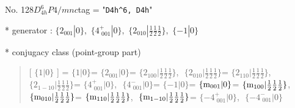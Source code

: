 \documentclass[fleqn,10pt,landscape]{jsarticle}
\begin{document}
\newpage

No. 128\quad$D_{4h}^{6}$\quad$P4/mnc$\quad[ tetragonal ]
tag = "{\tt D4h^6, D4h}"

* generator : $\{2{}_{001}|0\},\,\,\{4^{+}_{\,\,001}|0\},\,\,\{2{}_{010}|\frac{1}{2} \frac{1}{2} \frac{1}{2}\},\,\,\{-1|0\}$

* conjugacy class (point-group part)
\begin{quote}
[ $\{1|0\}$ ] = \quad $\{1|0\}$\newline[ $\{2{}_{001}|0\}$ ] = \quad $\{2{}_{001}|0\}$ = \quad $\{2{}_{100}|\frac{1}{2} \frac{1}{2} \frac{1}{2}\}$,\,\, $\{2{}_{010}|\frac{1}{2} \frac{1}{2} \frac{1}{2}\}$ = \quad $\{2{}_{110}|\frac{1}{2} \frac{1}{2} \frac{1}{2}\}$,\,\, $\{2{}_{1-10}|\frac{1}{2} \frac{1}{2} \frac{1}{2}\}$\newline[ $\{4^{+}_{\,\,001}|0\}$ ] = \quad $\{4^{+}_{\,\,001}|0\}$,\,\, $\{4^{-}_{\,\,001}|0\}$\newline[ $\{-1|0\}$ ] = \quad $\{-1|0\}$\newline[ $\{{\rm m}_{001}|0\}$ ] = \quad $\{{\rm m}_{001}|0\}$ = \quad $\{{\rm m}_{100}|\frac{1}{2} \frac{1}{2} \frac{1}{2}\}$,\,\, $\{{\rm m}_{010}|\frac{1}{2} \frac{1}{2} \frac{1}{2}\}$ = \quad $\{{\rm m}_{110}|\frac{1}{2} \frac{1}{2} \frac{1}{2}\}$,\,\, $\{{\rm m}_{1-10}|\frac{1}{2} \frac{1}{2} \frac{1}{2}\}$\newline[ $\{-4^{+}_{\,\,001}|0\}$ ] = \quad $\{-4^{+}_{\,\,001}|0\}$,\,\, $\{-4^{-}_{\,\,001}|0\}$\newline
\end{quote}
\end{document}
